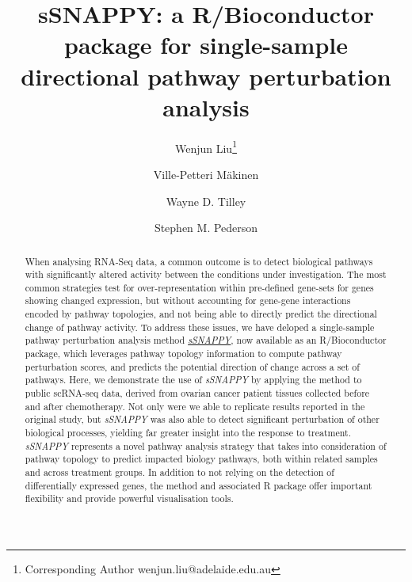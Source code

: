 \documentclass[9pt,a4paper,]{extarticle}
\begin{document}
\pagestyle{front}

\title{sSNAPPY: a R/Bioconductor package for single-sample directional pathway perturbation analysis}

\author[1]{Wenjun Liu\thanks{\ttfamily Corresponding Author wenjun.liu@adelaide.edu.au}}
\author[2,3,4,5]{Ville-Petteri Mäkinen}
\author[1]{Wayne D. Tilley}
\author[1,6,7]{Stephen M. Pederson}

\maketitle
\thispagestyle{front}

\begin{abstract}
When analysing RNA-Seq data, a common outcome is to detect biological pathways with significantly altered activity between the conditions under investigation. The most common strategies test for over-representation within pre-defined gene-sets for genes showing changed expression\citep{Subramanian2005-lx, Young2010-jw}, but without accounting for gene-gene interactions encoded by pathway topologies, and not being able to directly predict the directional change of pathway activity. To address these issues, we have deloped a single-sample pathway perturbation analysis method \href{https://bioconductor.org/packages/sSNAPPY}{\emph{sSNAPPY}}, now available as an R/Bioconductor package, which leverages pathway topology information to compute pathway perturbation scores, and predicts the potential direction of change across a set of pathways. Here, we demonstrate the use of \emph{sSNAPPY} by applying the method to public scRNA-seq data, derived from ovarian cancer patient tissues collected before and after chemotherapy. Not only were we able to replicate results reported in the original study, but \emph{sSNAPPY} was also able to detect significant perturbation of other biological processes, yielding far greater insight into the response to treatment. \emph{sSNAPPY} represents a novel pathway analysis strategy that takes into consideration of pathway topology to predict impacted biology pathways, both within related samples and across treatment groups. In addition to not relying on the detection of differentially expressed genes, the method and associated R package offer important flexibility and provide powerful visualisation tools.
\end{abstract}
\end{document}
